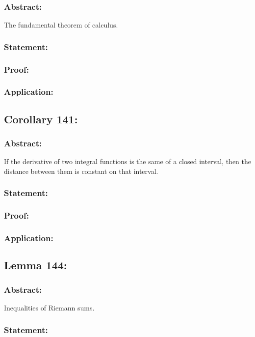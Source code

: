 \documentclass{article}
\begin{document}
\subsubsection*{Abstract:}
The fundamental theorem of calculus.
\subsubsection*{Statement:}

\subsubsection*{Proof:}

\subsubsection*{Application:}

\subsection{Corollary 141:}
\subsubsection*{Abstract:}
If the derivative of two integral functions is the same of a closed interval,
then the distance between them is constant on that interval.
\subsubsection*{Statement:}

\subsubsection*{Proof:}

\subsubsection*{Application:}

\subsection{Lemma 144:}
\subsubsection*{Abstract:}
Inequalities of Riemann sums.
\subsubsection*{Statement:}
\end{document}
